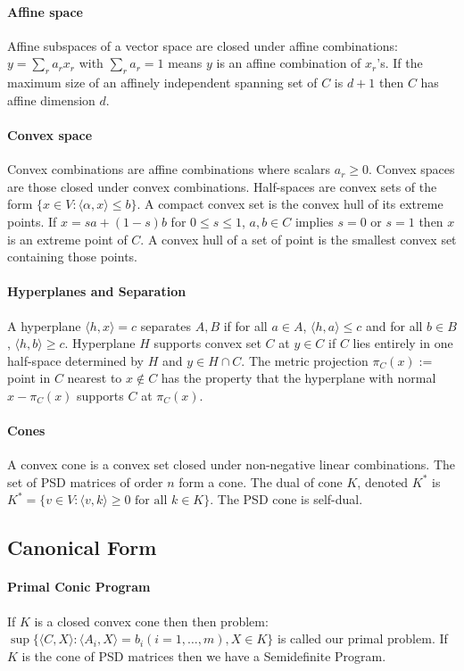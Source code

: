 \documentclass[letterpaper,11pt,oneside,onecolumn]{article}
\begin{document}
\paragraph{Affine space} Affine subspaces of a vector space are closed under affine combinations: $y = \sum_r a_r x_r$ with $\sum_r a_r =1$ means $y$ is an affine combination of $x_r$'s. If the maximum size of an affinely independent spanning set of $C$ is $d+1$ then $C$ has affine dimension $d$.
\paragraph{Convex space} Convex combinations are affine combinations where scalars $a_r \geq 0$. Convex spaces are those closed under convex combinations. Half-spaces are convex sets of the form $\{x \in V: \langle \alpha, x \rangle \leq b\}$. A compact convex set is the convex hull of its extreme points. If $x = sa + (1-s)b$ for $0\leq s \leq 1$, $a,b \in C$ implies $s=0$ or $s=1$ then $x$ is an extreme point of $C$. A convex hull of a set of point is the smallest convex set containing those points.
\paragraph{Hyperplanes and Separation}
A hyperplane $\langle h, x\rangle = c$ separates $A,B$ if for all $a \in A$, $\langle h, a\rangle \leq c$ and for all $b \in B$, $\langle h, b \rangle \geq c$. Hyperplane $H$ supports convex set $C$ at $y \in C$ if $C$ lies entirely in one half-space determined by $H$ and $y \in H \cap C$. The metric projection $\pi_C(x) :=$ point in $C$ nearest to $x \not\in C$ has the property that the hyperplane with normal $x - \pi_C(x)$ supports $C$ at $\pi_C(x)$.
\paragraph{Cones} A convex cone is a convex set closed under non-negative linear combinations. The set of PSD matrices of order $n$ form a cone. The dual of cone $K$, denoted $K^*$ is $K^*=\{v \in V: \langle v,k \rangle \geq 0 \text{ for all } k \in K \}$. The PSD cone is self-dual.
\subsection*{Canonical Form}
\paragraph{Primal Conic Program} If $K$ is a closed convex cone then then problem:
$\sup \{\langle C, X \rangle : \langle A_i, X \rangle = b_i (i=1,\dots, m), X \in K \} $ is called our primal problem. If $K$ is the cone of PSD matrices then we have a Semidefinite Program.
\end{document}
